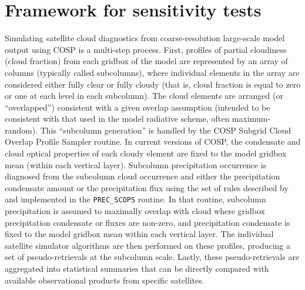\section{Framework for sensitivity tests}\label{section_sg_framework}
Simulating satellite cloud diagnostics from coarse-resolution large-scale model output using COSP is a multi-step process. First, profiles of partial cloudiness (cloud fraction) from each gridbox of the model are represented by an array of columns (typically called subcolumns), where individual elements in the array are considered either fully clear or fully cloudy (that is, cloud fraction is equal to zero or one at each level in each subcolumn). The cloud elements are arranged (or ``overlapped'') consistent with a given overlap assumption (intended to be consistent with that used in the model radiative scheme, often maximum-random). This ``subcolumn generation'' is handled by the COSP Subgrid Cloud Overlap Profile Sampler \citep[SCOPS;][]{klein_and_jakob_1999} routine. In current versions of COSP, the condensate and cloud optical properties of each cloudy element are fixed to the model gridbox mean (within each vertical layer). Subcolumn precipitation occurrence is diagnosed from the subcolumn cloud occurrence and either the precipitation condensate amount or the precipitation flux using the set of rules described by \cite{zhang_et_al_2010} and implemented in the {\tt PREC\_SCOPS} routine. In that routine, subcolumn precipitation is assumed to maximally overlap with cloud where gridbox precipitation condensate or fluxes are non-zero, and precipitation condensate is fixed to the model gridbox mean within each vertical layer. The individual satellite simulator algorithms are then performed on these profiles, producing a set of pseudo-retrievals at the subcolumn scale. Lastly, these pseudo-retrievals are aggregated into statistical summaries that can be directly compared with available observational products from specific satellites.


